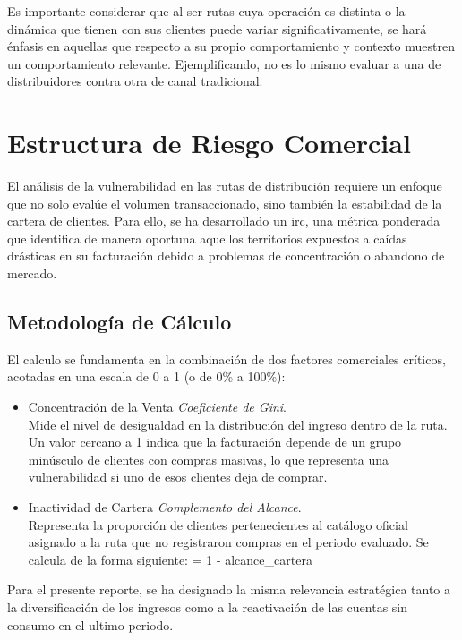 \documentclass[12pt, letterpaper]{article}
\begin{document}
Es importante considerar que al ser rutas cuya operación es distinta o la dinámica que tienen con sus clientes puede variar significativamente, se hará énfasis en aquellas
que respecto a su propio comportamiento y contexto muestren un comportamiento relevante. Ejemplificando, no es lo mismo evaluar a una de distribuidores contra
otra de canal tradicional.

\section{Estructura de Riesgo Comercial}

El análisis de la vulnerabilidad en las rutas de distribución requiere un enfoque que no
solo evalúe el volumen transaccionado, sino también la estabilidad de la cartera de clientes.
Para ello, se ha desarrollado un \gls{irc}, una métrica ponderada que
identifica de manera oportuna aquellos territorios expuestos a caídas drásticas en su facturación
debido a problemas de concentración o abandono de mercado.

\subsection{Metodología de Cálculo}
El calculo se fundamenta en la combinación de dos factores comerciales críticos, acotadas en una escala de 0 a 1 (o de 0\% a 100\%):

\begin{itemize}
    \item Concentración de la Venta \textit{Coeficiente de Gini}.\\
    Mide el nivel de desigualdad en la distribución del ingreso dentro de la ruta.
    Un valor cercano a 1 indica que la facturación depende de un grupo minúsculo de clientes con compras masivas, lo que representa una
    vulnerabilidad si uno de esos clientes deja de comprar.

    \item Inactividad de Cartera \textit{Complemento del Alcance}. \\
    Representa la proporción de clientes pertenecientes al catálogo oficial asignado a la ruta que no registraron
    compras en el periodo evaluado. Se calcula de la forma siguiente:  = 1 - \gls{alcance_cartera}
\end{itemize}

Para el presente reporte, se ha designado la misma relevancia estratégica tanto a la diversificación de los ingresos como a la
reactivación de las cuentas sin consumo en el ultimo periodo.
\end{document}
